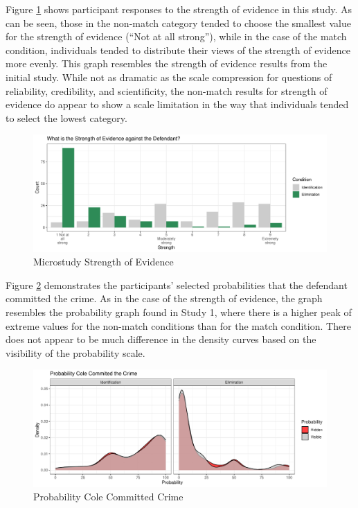 \documentclass[print]{nuthesis}
\begin{document}
Figure \ref{fig:strength2} shows participant responses to the strength of evidence in this study.
As can be seen, those in the non-match category tended to choose the smallest value for the strength of evidence (``Not at all strong''), while in the case of the match condition, individuals tended to distribute their views of the strength of evidence more evenly.
This graph resembles the strength of evidence results from the initial study.
While not as dramatic as the scale compression for questions of reliability, credibility, and scientificity, the non-match results for strength of evidence do appear to show a scale limitation in the way that individuals tended to select the lowest category.

\begin{figure}

{\centering \includegraphics[width=\linewidth]{thesis_files/figure-latex/strength2-1} 

}

\caption{Microstudy Strength of Evidence}\label{fig:strength2}
\end{figure}

Figure \ref{fig:prob2} demonstrates the participants' selected probabilities that the defendant committed the crime.
As in the case of the strength of evidence, the graph resembles the probability graph found in Study 1, where there is a higher peak of extreme values for the non-match conditions than for the match condition.
There does not appear to be much difference in the density curves based on the visibility of the probability scale.

\begin{figure}

{\centering \includegraphics[width=\linewidth]{thesis_files/figure-latex/prob2-1} 

}

\caption{Probability Cole Committed Crime}\label{fig:prob2}
\end{figure}
\end{document}

